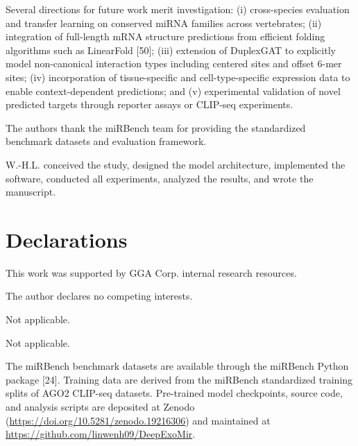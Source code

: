\documentclass[sn-mathphys-num]{sn-jnl}
\begin{document}
Several directions for future work merit investigation: (i) cross-species evaluation and transfer learning on conserved miRNA families across vertebrates; (ii) integration of full-length mRNA structure predictions from efficient folding algorithms such as LinearFold [50]; (iii) extension of DuplexGAT to explicitly model non-canonical interaction types including centered sites and offset 6-mer sites; (iv) incorporation of tissue-specific and cell-type-specific expression data to enable context-dependent predictions; and (v) experimental validation of novel predicted targets through reporter assays or CLIP-seq experiments.

\backmatter


The authors thank the miRBench team for providing the standardized benchmark datasets and evaluation framework.


W.-H.L. conceived the study, designed the model architecture, implemented the software, conducted all experiments, analyzed the results, and wrote the manuscript.

\section*{Declarations}


This work was supported by GGA Corp. internal research resources.


The author declares no competing interests.


Not applicable.


Not applicable.


The miRBench benchmark datasets are available through the miRBench Python package [24]. Training data are derived from the miRBench standardized training splits of AGO2 CLIP-seq datasets. Pre-trained model checkpoints, source code, and analysis scripts are deposited at Zenodo (\url{https://doi.org/10.5281/zenodo.19216306}) and maintained at \url{https://github.com/linwenh09/DeepExoMir}.
\end{document}
